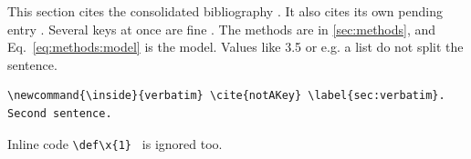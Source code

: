 
This section cites the consolidated bibliography \parencite{knuthTeXbook1984}.
It also cites its own pending entry \textcite[p.~3]{doeSurvey2021}.
Several keys at once are fine \cites[see][12]{knuthTeXbook1984}{lamport1994}.
The methods are in \autoref{sec:methods}, and Eq.~\eqref{eq:methods:model} is the model.
Values like 3.5 or e.g. a list do not split the sentence.

\begin{verbatim}
\newcommand{\inside}{verbatim} \cite{notAKey} \label{sec:verbatim}. Second sentence.
\end{verbatim}
Inline code \verb|\def\x{1} | is ignored too.
\nocite{*}

